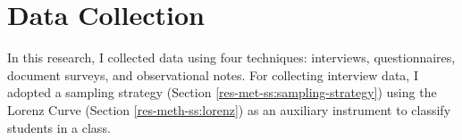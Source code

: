 \section{Data Collection}
\label{res-met:data-collection}


                

        


        

In this research, I collected data using four techniques: interviews, questionnaires, document surveys, and observational notes. For collecting interview data, I adopted a sampling strategy (Section \ref{res-met-ss:sampling-strategy}) using the Lorenz Curve (Section \ref{res-meth-ss:lorenz}) as an auxiliary instrument to classify students in a class.

